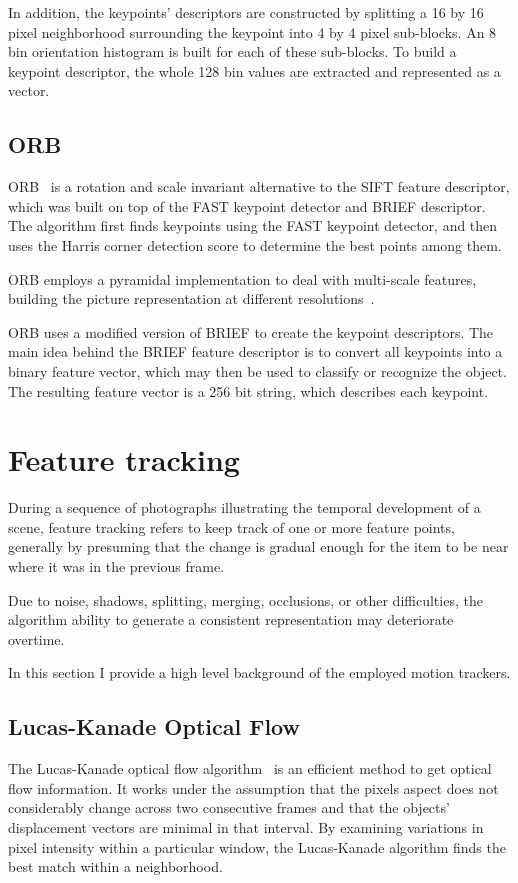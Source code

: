 \documentclass[journal]{IEEEtran}
\begin{document}
In addition, the keypoints' descriptors are constructed by splitting a 16 by 16 pixel neighborhood surrounding the keypoint into 4 by 4 pixel sub-blocks. An 8 bin orientation histogram is built for each of these sub-blocks. To build a keypoint descriptor, the whole 128 bin values are extracted and represented as a vector.

\subsection{ORB}
ORB~\cite{rublee2011orb} is a rotation and scale invariant alternative to the SIFT feature descriptor, which was built on top of the FAST keypoint detector and BRIEF descriptor.
The algorithm first finds keypoints using the FAST keypoint detector, and then uses the Harris corner detection score to determine the best points among them.

ORB employs a pyramidal implementation to deal with multi-scale features, building the picture representation at different resolutions~\cite{opencv_library}.

ORB uses a modified version of BRIEF to create the keypoint descriptors. The main idea behind the BRIEF feature descriptor is to convert all keypoints into a binary feature vector, which may then be used to classify or recognize the object. The resulting feature vector is a 256 bit string, which describes each keypoint.

\section{Feature tracking}
\label{sec:featuretracking}
During a sequence of photographs illustrating the temporal development of a scene, feature tracking refers to keep track of one or more feature points, generally by presuming that the change is gradual enough for the item to be near where it was in the previous frame.

Due to noise, shadows, splitting, merging, occlusions, or other difficulties, the algorithm ability to generate a consistent representation may deteriorate overtime.

In this section I provide a high level background of the employed motion trackers.

\subsection{Lucas-Kanade Optical Flow}

The Lucas-Kanade optical flow algorithm~\cite{lucas1981iterative} is an efficient method to get optical flow information. It works under the assumption that the pixels aspect does not considerably change across two consecutive frames and that the objects' displacement vectors are minimal in that interval. By examining variations in pixel intensity within a particular window, the Lucas-Kanade algorithm finds the best match within a neighborhood.
\end{document}
